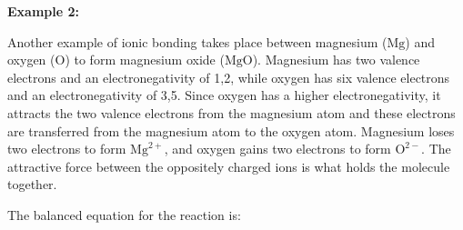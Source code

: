         \label{m38684*id142353}
          \textbf{Example 2:}
        \par 
        \label{m38684*id142360}Another example of ionic bonding takes place between magnesium (\begin{math}\mathrm{Mg}\end{math}) and oxygen (\begin{math}\mathrm{O}\end{math}) to form magnesium oxide (\begin{math}\mathrm{MgO}\end{math}). Magnesium has two valence electrons and an electronegativity of 1,2, while oxygen has six valence electrons and an electronegativity of 3,5. Since oxygen has a higher electronegativity, it attracts the two valence electrons from the magnesium atom and these electrons are transferred from the magnesium atom to the oxygen atom. Magnesium loses two electrons to form \begin{math}{\mathrm{Mg}}^{2+}\end{math}, and oxygen gains two electrons to form \begin{math}{\mathrm{O}}^{2-}\end{math}. The attractive force between the oppositely charged ions is what holds the molecule together.\par 
        \label{m38684*id138529}The balanced equation for the reaction is:\par 
        \label{m38684*id138535}\nopagebreak\noindent{}
    

